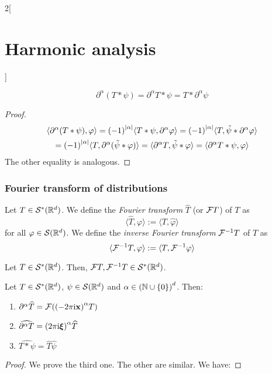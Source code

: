 \documentclass[../../../main_math.tex]{subfiles}
\begin{document}
\begin{multicols}{2}[\section{Harmonic analysis}]
\begin{lemma}
    $$
      \partial^\alpha(T*\psi)=\partial^\alpha T*\psi=T*\partial^\alpha\psi
    $$
  \end{lemma}
  \begin{proof}
    \begin{multline*}
      \langle \partial^\alpha(T*\psi),\varphi\rangle={(-1)}^{\abs{\alpha}}\langle T*\psi,\partial^\alpha\varphi\rangle={(-1)}^{\abs{\alpha}}\langle T,\tilde\psi*\partial^\alpha\varphi\rangle\\={(-1)}^{\abs{\alpha}}\langle T,\partial^\alpha(\tilde\psi*\varphi)\rangle
      =\langle \partial^\alpha T,\tilde\psi*\varphi\rangle   =\langle \partial^\alpha T*\psi,\varphi\rangle
    \end{multline*}
    The other equality is analogous.
  \end{proof}
  \subsubsection{Fourier transform of distributions}
  \begin{definition}
    Let $T\in \mathcal{S}^*(\mathbb{R}^d)$. We define the \emph{Fourier transform} $\widehat{T}$ (or $\mathcal{F}{T}$) of $T$ as
    $$
      \langle \widehat{T},\varphi\rangle:=\langle T,\widehat{\varphi}\rangle
    $$
    for all $\varphi\in \mathcal{S}(\mathbb{R}^d)$. We define the \emph{inverse Fourier transform} $\mathcal{F}^{-1}{T}$ of $T$ as
    $$
      \langle \mathcal{F}^{-1}{T},\varphi\rangle:=\langle T,\mathcal{F}^{-1}{\varphi}\rangle
    $$
  \end{definition}
  \begin{lemma}
    Let $T\in \mathcal{S}^*(\mathbb{R}^d)$. Then, $\mathcal{F}{T},\mathcal{F}^{-1}T\in \mathcal{S}^*(\mathbb{R}^d)$.
  \end{lemma}
  \begin{proposition}\label{HA:diff_FourierTrans_distribution}
    Let $T\in \mathcal{S}^*(\mathbb{R}^d)$, $\psi \in \mathcal{S}(\mathbb{R}^d)$ and $\alpha\in{(\ensuremath{\mathbb{N}}\cup\{0\})}^d$. Then:
    \begin{enumerate}
      \item $\partial^\alpha\widehat{T}=\mathcal{F}({{(-2\pi\mathrm{i} \boldsymbol{\mathrm{x}})}^{\alpha} T})$
      \item $\widehat{\partial^\alpha T}={(2\pi\mathrm{i} \boldsymbol{\mathrm{\xi}})}^{\alpha}\widehat{T}$
      \item $\widehat{T*\psi}=\widehat{T}\widehat{\psi}$
    \end{enumerate}
  \end{proposition}
  \begin{proof}
    We prove the third one. The other are similar. We have:

\end{proof}
\end{multicols}
\end{document}
